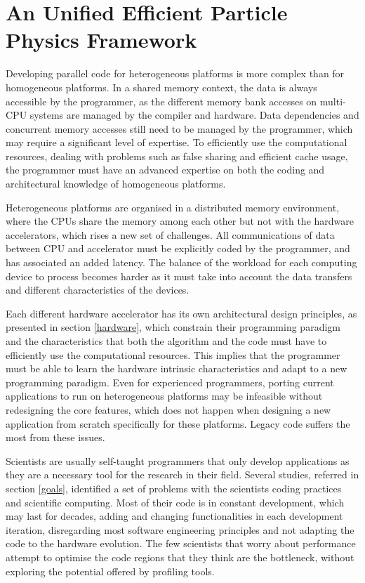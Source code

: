 \chapter{An Unified Efficient Particle Physics Framework}
\label{new_lipmini}

Developing parallel code for heterogeneous platforms is more complex than for homogeneous platforms. In a shared memory context, the data is always accessible by the programmer, as the different memory bank accesses on multi-CPU systems are managed by the compiler and hardware. Data dependencies and concurrent memory accesses still need to be managed by the programmer, which may require a significant level of expertise. To efficiently use the computational resources, dealing with problems such as false sharing and efficient cache usage, the programmer must have an advanced expertise on both the coding and architectural knowledge of homogeneous platforms.

Heterogeneous platforms are organised in a distributed memory environment, where the CPUs share the memory among each other but not with the hardware accelerators, which rises a new set of challenges. All communications of data between CPU and accelerator must be explicitly coded by the programmer, and has associated an added latency. The balance of the workload for each computing device to process becomes harder as it must take into account the data transfers and different characteristics of the devices.

Each different hardware accelerator has its own architectural design principles, as presented in section \ref{hardware}, which constrain their programming paradigm and the characteristics that both the algorithm and the code must have to efficiently use the computational resources. This implies that the programmer must be able to learn the hardware intrinsic characteristics and adapt to a new programming paradigm. Even for experienced programmers, porting current applications to run on heterogeneous platforms may be infeasible without redesigning the core features, which does not happen when designing a new application from scratch specifically for these platforms. Legacy code suffers the most from these issues.

Scientists are usually self-taught programmers that only develop applications as they are a necessary tool for the research in their field. Several studies, referred in section \ref{goals}, identified a set of problems with the scientists coding practices and scientific computing. Most of their code is in constant development, which may last for decades, adding and changing functionalities in each development iteration, disregarding most software engineering principles and not adapting the code to the hardware evolution. The few scientists that worry about performance attempt to optimise the code regions that they think are the bottleneck, without exploring the potential offered by profiling tools.

